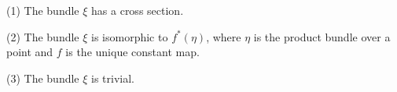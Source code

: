 (1) The bundle $\xi$ has a cross section.

(2) The bundle $\xi$ is isomorphic to $f^*(\eta)$, where $\eta$ is the product bundle over a point and $f$ is the unique constant map.

(3) The bundle $\xi$ is trivial.
